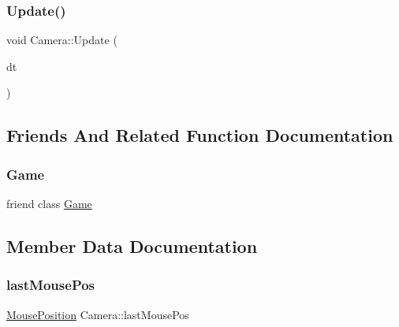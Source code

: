 \mbox{\label{class_camera_ac8e78ac212afde90f72d59b3795474d0}} 
\subsubsection{\texorpdfstring{Update()}{Update()}}
{\footnotesize\ttfamily void Camera\+::\+Update (\begin{DoxyParamCaption}\item[{G\+Lfloat}]{dt }\end{DoxyParamCaption})}



\subsection{Friends And Related Function Documentation}
\mbox{\label{class_camera_aa2fab026580d6f14280c2ffb8063a314}} 
\subsubsection{\texorpdfstring{Game}{Game}}
{\footnotesize\ttfamily friend class \mbox{\hyperlink{class_game}{Game}}\hspace{0.3cm}{\ttfamily [friend]}}



\subsection{Member Data Documentation}
\mbox{\label{class_camera_a452e0aabdcd36e235c2f8705b736482c}} 
\subsubsection{\texorpdfstring{lastMousePos}{lastMousePos}}
{\footnotesize\ttfamily \mbox{\hyperlink{struct_mouse_position}{Mouse\+Position}} Camera\+::last\+Mouse\+Pos\hspace{0.3cm}{\ttfamily [protected]}}

\mbox{\label{class_camera_a481e669a6f96826929e323706543a6a4}} 
